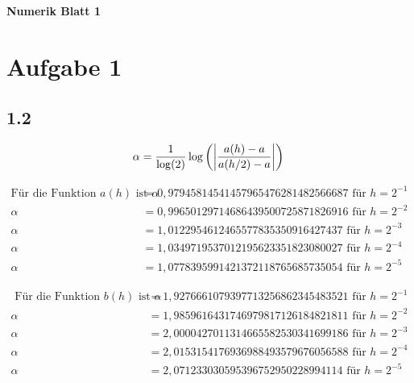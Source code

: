 \documentclass[10pt,oneside,a4paper]{scrartcl}
\begin{document}

	\begin{center}
		\huge %
		\bfseries %
		\sffamily %
		Numerik Blatt 1\\[1em]
	\end{center}

	
	\section*{Aufgabe 1}

	\subsection*{1.2}

	\begin{equation*}
		\alpha = \frac{1}{\log(2)}\log \left( \left|\frac{a(h)-a}{a(h/2)-a}\right| \right)\\
	\end{equation*}

	\begin{align*}
		\text {Für die Funktion } a(h) \text { ist } \alpha &= 0,97945814541457965476281482566687 \text { für } h = 2^{-1} \\
		\alpha &= 0,99650129714686439500725871826916 \text { für } h = 2^{-2}\\
		\alpha &=1,0122954612465577835350916427437 \text { für } h = 2^{-3}\\
		\alpha &=1,0349719537012195623351823080027 \text { für } h = 2^{-4}\\
		\alpha &=1,0778395991421372118765685735054 \text { für } h = 2^{-5}
	\end{align*}

	\begin{align*}
 		\text{ Für die Funktion } b(h) \text { ist } \alpha &= 1,9276661079397713256862345483521 \text { für } h = 2^{-1} \\
		\alpha &=1,9859616431746979817126184821811 \text { für } h = 2^{-2} \\
		\alpha &=2,0000427011314665582530341699186 \text { für } h = 2^{-3} \\
		\alpha &=2,0153154176936988493579676056588 \text { für } h = 2^{-4} \\
		\alpha &=2,071233030595396752950228994114 \text { für } h = 2^{-5}
 	\end{align*}
\end{document}
